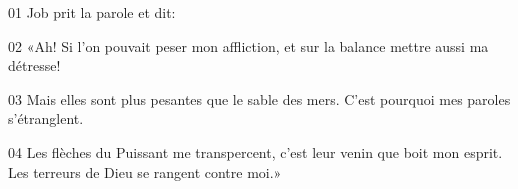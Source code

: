 01 Job prit la parole et dit:

02 «Ah! Si l’on pouvait peser mon affliction, et sur la balance mettre aussi ma détresse!

03 Mais elles sont plus pesantes que le sable des mers. C’est pourquoi mes paroles s’étranglent.

04 Les flèches du Puissant me transpercent, c’est leur venin que boit mon esprit. Les terreurs de Dieu se rangent contre moi.»
